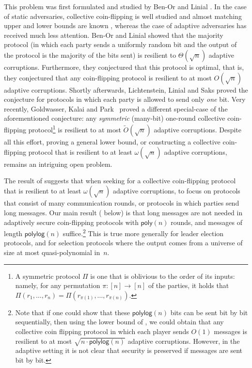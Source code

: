 \documentclass[11pt]{article}
\theoremstyle{plain}
\theoremstyle{definition}
\numberwithin{equation}{section}
\numberwithin{equation}{section} \newcommand{\aka} {also known as\ }
\newcommand{\1}{\mathbf{1}}
\newcommand{\poly}{{\mathsf{poly}}}
\newcommand{\polylog}{{\mathsf{polylog}}}
\theoremstyle{remark}
\begin{document}
This problem was first formulated and studied by Ben-Or and Linial
\cite{BenOrL85}. In the case of static adversaries, collective coin-flipping is
well studied and almost matching upper and lower bounds are known
\cite{Feige99,RussellSZ02}, whereas the case of adaptive adversaries has
received much less attention. Ben-Or and Linial \cite{BenOrL85} showed that the
majority protocol (in which each party sends a uniformly random bit and the
output of the protocol is the majority of the bits sent) is resilient to
$\Theta(\sqrt{n})$ adaptive corruptions. Furthermore, they conjectured that this
protocol is optimal, that is, they conjectured that any coin-flipping protocol
is resilient to at most $O(\sqrt{n})$ adaptive corruptions. Shortly afterwards,
Lichtenstein, Linial and Saks \cite{LichtensteinLS89} proved the conjecture for
protocols in which each party is allowed to send only \emph{one} bit. Very
recently, Goldwasser, Kalai and Park~\cite{GoldwasserKP15} proved a different
special-case of the aforementioned conjecture: any \emph{symmetric} (many-bit)
one-round collective coin-flipping protocol\footnote{A symmetric protocol $\Pi$
  is one that is oblivious to the order of its inputs: namely, for any
  permutation $\pi\colon[n]\to [n]$ of the parties, it holds that
  $\Pi(r_1,\dots,r_n) = \Pi(r_{\pi(1)},\dots, r_{\pi(n)} )$.} is resilient to at
most $\widetilde{O}(\sqrt{n})$ adaptive corruptions.  Despite all this effort,
proving a general lower bound, or constructing a collective coin-flipping
protocol that is resilient to at least $\omega(\sqrt{n})$ adaptive corruptions,
remains an intriguing open problem.

The result of \cite{LichtensteinLS89} suggests that when seeking for a
collective coin-flipping protocol that is resilient to at least
$\omega(\sqrt{n})$ adaptive corruptions, to focus on protocols that consist of
many communication rounds, or protocols in which parties send long messages.
Our main result ( below) is that long messages are not
needed in adaptively secure coin-flipping protocols with $\poly(n)$ rounds, and
messages of length $\polylog(n)$ suffice.\footnote{Note that if one could show
  that these $\polylog(n)$ bits can be sent bit by bit sequentially, then using
  the lower bound of \cite{LichtensteinLS89}, we could obtain that any
  collective coin flipping protocol in which each player sends $O(1)$ messages
  is resilient to at most $\sqrt{n\cdot \polylog(n)}$ adaptive
  corruptions. However, in the adaptive setting it is not clear that security is
  preserved if messages are sent bit by bit.} This is true more generally for
leader election protocols, and for selection protocols where the output comes
from a universe of size at most quasi-polynomial in~$n$.
\end{document}
